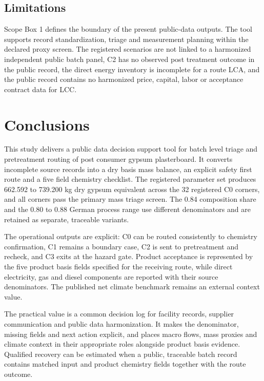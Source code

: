 \documentclass[pdflatex,sn-basic]{sn-jnl}
\begin{document}
\subsection{Limitations}\label{limitations}

Scope Box 1 defines the boundary of the present public-data outputs. The tool supports record standardization, triage and measurement planning within the declared proxy screen. The registered scenarios are not linked to a harmonized independent public batch panel, C2 has no observed post treatment outcome in the public record, the direct energy inventory is incomplete for a route LCA, and the public record contains no harmonized price, capital, labor or acceptance contract data for LCC.

\section{Conclusions}\label{conclusions}

This study delivers a public data decision support tool for batch level triage and pretreatment routing of post consumer gypsum plasterboard. It converts incomplete source records into a dry basis mass balance, an explicit safety first route and a five field chemistry checklist. The registered parameter set produces 662.592 to 739.200 kg dry gypsum equivalent across the 32 registered C0 corners, and all corners pass the primary mass triage screen. The 0.84 composition share and the 0.80 to 0.88 German process range use different denominators and are retained as separate, traceable variants.

The operational outputs are explicit: C0 can be routed consistently to chemistry confirmation, C1 remains a boundary case, C2 is sent to pretreatment and recheck, and C3 exits at the hazard gate. Product acceptance is represented by the five product basis fields specified for the receiving route, while direct electricity, gas and diesel components are reported with their source denominators. The published net climate benchmark remains an external context value.

The practical value is a common decision log for facility records, supplier communication and public data harmonization. It makes the denominator, missing fields and next action explicit, and places macro flows, mass proxies and climate context in their appropriate roles alongside product basis evidence. Qualified recovery can be estimated when a public, traceable batch record contains matched input and product chemistry fields together with the route outcome.
\end{document}
